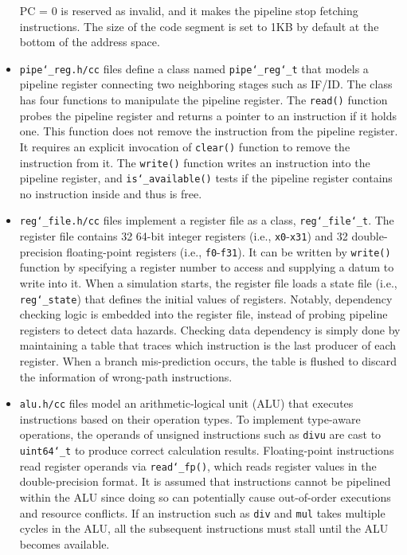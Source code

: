 \documentclass[10pt]{article}
\begin{document}
\begin{itemize}
    PC = 0 is reserved as invalid, and it makes the pipeline stop fetching instructions.
    The size of the code segment is set to 1KB by default at the bottom of the address space.
\item
    {\tt pipe\char`_reg.h/cc} files define a class named {\tt pipe\char`_reg\char`_t} that models a pipeline register connecting two neighboring stages such as IF/ID.
    The class has four functions to manipulate the pipeline register.
    The {\tt read()} function probes the pipeline register and returns a pointer to an instruction if it holds one.
    This function does not remove the instruction from the pipeline register.
    It requires an explicit invocation of {\tt clear()} function to remove the instruction from it.
    The {\tt write()} function writes an instruction into the pipeline register, and {\tt is\char`_available()} tests if the pipeline register contains no instruction inside and thus is free.
\item{\tt reg\char`_file.h/cc} files implement a register file as a class, {\tt reg\char`_file\char`_t}.
    The register file contains 32 64-bit integer registers (i.e., {\tt x0}-{\tt x31}) and 32 double-precision floating-point registers (i.e., {\tt f0}-{\tt f31}).
    It can be written by {\tt write()} function by specifying a register number to access and supplying a datum to write into it.
    When a simulation starts, the register file loads a state file (i.e., {\tt reg\char`_state}) that defines the initial values of registers.
    Notably, dependency checking logic is embedded into the register file, instead of probing pipeline registers to detect data hazards.
    Checking data dependency is simply done by maintaining a table that traces which instruction is the last producer of each register.
    When a branch mis-prediction occurs, the table is flushed to discard the information of wrong-path instructions.
\item
    {\tt alu.h/cc} files model an arithmetic-logical unit (ALU) that executes instructions based on their operation types.
    To implement type-aware operations, the operands of unsigned instructions such as {\tt divu} are cast to {\tt uint64\char`_t} to produce correct calculation results.
    Floating-point instructions read register operands via {\tt read\char`_fp()}, which reads register values in the double-precision format.
    It is assumed that instructions cannot be pipelined within the ALU since doing so can potentially cause out-of-order executions and resource conflicts.
    If an instruction such as {\tt div} and {\tt mul} takes multiple cycles in the ALU, all the subsequent instructions must stall until the ALU becomes available.

\end{itemize}
\end{document}
